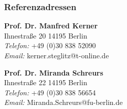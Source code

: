 \documentclass[11pt,a4paper]{article}
\begin{document}
\subsubsection*{\color{purplecolor} Referenzadressen}

\begin{compactitem}

	\item \textbf{Prof. Dr. Manfred Kerner}\\
					Ihnestraße 20	14195 Berlin\\
					\textsl{Telefon:} +49 (0)30 838 52090\\
					\textsl{Email:} kerner.steglitz@t-online.de 
	
	
	\item \textbf{Prof. Dr. Miranda Schreurs}\\
					Ihnestraße 22	14195 Berlin\\
					\textsl{Telefon:} +49 (0)30 838 56654\\
					\textsl{Email:} Miranda.Schreurs@fu-berlin.de

\end{compactitem}
\end{document}
